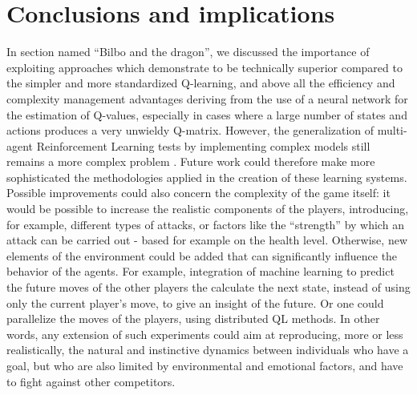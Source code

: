 \section{Conclusions and implications}
In section named ``Bilbo and the dragon'', we discussed the importance of exploiting approaches which demonstrate to be technically superior compared to the simpler and more standardized Q-learning, and above all the efficiency and complexity management advantages deriving from the use of a neural network for the estimation of Q-values, especially in cases where a large number of states and actions produces a very unwieldy Q-matrix. However, the generalization of multi-agent Reinforcement Learning tests by implementing complex models still remains a more complex problem \cite{1}. Future work could therefore make more sophisticated the methodologies applied in the creation of these learning systems.
Possible improvements could also concern the complexity of the game itself: it would be possible to increase the realistic components of the players, introducing, for example, different types of attacks, or factors like the ``strength'' by which an attack can be carried out - based for example on the health level. 
Otherwise, new elements of the environment could be added that can significantly influence the behavior of the agents.
For example, integration of machine learning to predict the future moves of the other players the calculate the next state, instead of using only the current player's move, to give an insight of the future. Or one could parallelize the moves of the players, using distributed QL methods\cite{9}.
In other words, any extension of such experiments could aim at reproducing, more or less realistically, the natural and instinctive dynamics between individuals who have a goal, but who are also limited by environmental and emotional factors, and have to fight against other competitors.
\pagebreak
\onecolumn
\nocite{*}





